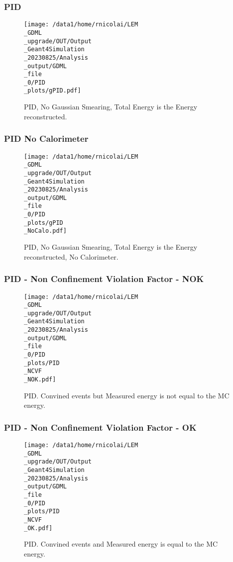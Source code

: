 \documentclass[8pt]{beamer}
\begin{document}
            \begin{frame}
                \frametitle{PID}
            
        \begin{figure}[h]
            \centering
            \texttt{[image: /data1/home/rnicolai/LEM\\\_GDML\\\_upgrade/OUT/Output\\\_Geant4Simulation\\\_20230825/Analysis\\\_output/GDML\\\_file\\\_0/PID\\\_plots/gPID.pdf]}
            \caption{PID, No Gaussian Smearing, Total Energy is the Energy reconstructed.}
        \end{figure}
        
            \end{frame}
            
            \begin{frame}
                \frametitle{PID No Calorimeter}
            
        \begin{figure}[h]
            \centering
            \texttt{[image: /data1/home/rnicolai/LEM\\\_GDML\\\_upgrade/OUT/Output\\\_Geant4Simulation\\\_20230825/Analysis\\\_output/GDML\\\_file\\\_0/PID\\\_plots/gPID\\\_NoCalo.pdf]}
            \caption{PID, No Gaussian Smearing, Total Energy is the Energy reconstructed, No Calorimeter.}
        \end{figure}
        
            \end{frame}
            
            \begin{frame}
                \frametitle{PID - Non Confinement Violation Factor - NOK}
            
        \begin{figure}[h]
            \centering
            \texttt{[image: /data1/home/rnicolai/LEM\\\_GDML\\\_upgrade/OUT/Output\\\_Geant4Simulation\\\_20230825/Analysis\\\_output/GDML\\\_file\\\_0/PID\\\_plots/PID\\\_NCVF\\\_NOK.pdf]}
            \caption{PID. Convined events but Measured energy is not equal to the MC energy.}
        \end{figure}
        
            \end{frame}
            
            \begin{frame}
                \frametitle{PID - Non Confinement Violation Factor - OK}
            
        \begin{figure}[h]
            \centering
            \texttt{[image: /data1/home/rnicolai/LEM\\\_GDML\\\_upgrade/OUT/Output\\\_Geant4Simulation\\\_20230825/Analysis\\\_output/GDML\\\_file\\\_0/PID\\\_plots/PID\\\_NCVF\\\_OK.pdf]}
            \caption{PID. Convined events and Measured energy is equal to the MC energy.}
        \end{figure}
        
            \end{frame}
            
\end{document}
